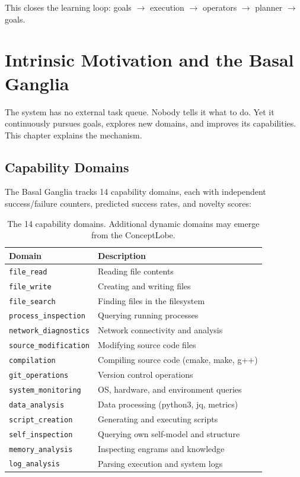 \documentclass[12pt,a4paper]{report}
\begin{document}
This closes the learning loop: goals $\to$ execution $\to$ operators $\to$ planner $\to$ goals.

\chapter{Intrinsic Motivation and the Basal Ganglia}

The system has no external task queue. Nobody tells it what to do. Yet it continuously pursues goals, explores new domains, and improves its capabilities. This chapter explains the mechanism.

\section{Capability Domains}
The Basal Ganglia tracks 14 capability domains, each with independent success/failure counters, predicted success rates, and novelty scores:

\begin{table}[H]
\centering
\small
\begin{tabular}{ll}
\toprule
\textbf{Domain} & \textbf{Description} \\
\midrule
\texttt{file\_read} & Reading file contents \\
\texttt{file\_write} & Creating and writing files \\
\texttt{file\_search} & Finding files in the filesystem \\
\texttt{process\_inspection} & Querying running processes \\
\texttt{network\_diagnostics} & Network connectivity and analysis \\
\texttt{source\_modification} & Modifying source code files \\
\texttt{compilation} & Compiling source code (cmake, make, g++) \\
\texttt{git\_operations} & Version control operations \\
\texttt{system\_monitoring} & OS, hardware, and environment queries \\
\texttt{data\_analysis} & Data processing (python3, jq, metrics) \\
\texttt{script\_creation} & Generating and executing scripts \\
\texttt{self\_inspection} & Querying own self-model and structure \\
\texttt{memory\_analysis} & Inspecting engrams and knowledge \\
\texttt{log\_analysis} & Parsing execution and system logs \\
\bottomrule
\end{tabular}
\caption{The 14 capability domains. Additional dynamic domains may emerge from the ConceptLobe.}
\end{table}
\end{document}
